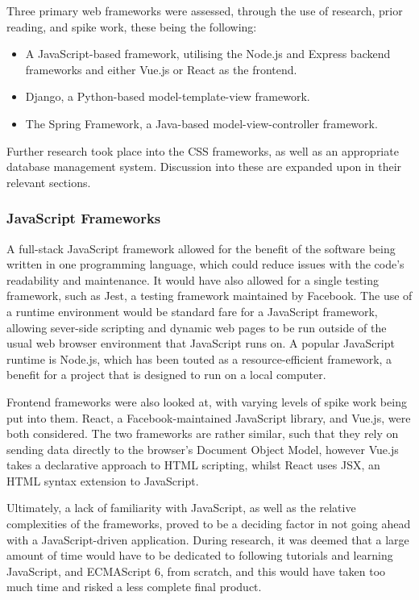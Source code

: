 Three primary web frameworks were assessed, through the use of research, prior reading, and spike work, these being the following:

\begin{itemize}
\item	A JavaScript-based framework, utilising the Node.js and Express backend frameworks and either Vue.js or React as the frontend.
\item	Django, a Python-based model-template-view framework.
\item	The Spring Framework, a Java-based model-view-controller framework.
\end{itemize}

Further research took place into the CSS frameworks, as well as an appropriate database management system. Discussion into these are expanded upon in their relevant sections.

\subsubsection{JavaScript Frameworks}

A full-stack JavaScript framework allowed for the benefit of the software being written in one programming language, which could reduce issues with the code's readability and maintenance. It would have also allowed for a single testing framework, such as Jest, a testing framework maintained by Facebook.
The use of a runtime environment would be standard fare for a JavaScript framework, allowing sever-side scripting and dynamic web pages to be run outside of the usual web browser environment that JavaScript runs on. A popular JavaScript runtime is Node.js, which has been touted as a resource-efficient framework, a benefit for a project that is designed to run on a local computer.


Frontend frameworks were also looked at, with varying levels of spike work being put into them. React, a Facebook-maintained JavaScript library, and Vue.js, were both considered. The two frameworks are rather similar, such that they rely on sending data directly to the browser's Document Object Model, however Vue.js takes a declarative approach to HTML scripting, whilst React uses JSX, an HTML syntax extension to JavaScript.


Ultimately, a lack of familiarity with JavaScript, as well as the relative complexities of the frameworks, proved to be a deciding factor in not going ahead with a JavaScript-driven application. During research, it was deemed that a large amount of time would have to be dedicated to following tutorials and learning JavaScript, and ECMAScript 6, from scratch, and this would have taken too much time and risked a less complete final product.

